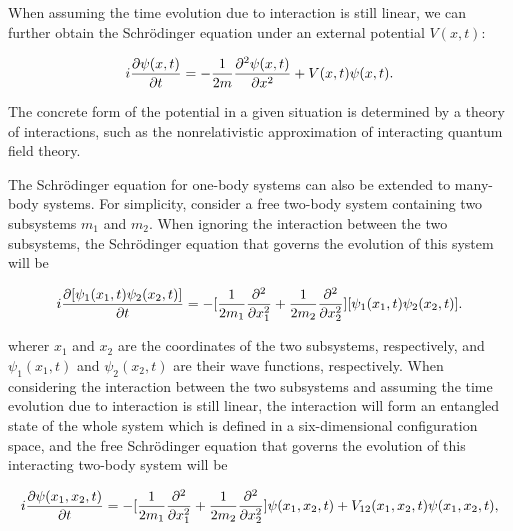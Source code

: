 When assuming the time evolution due to interaction is still linear, we can further obtain the Schr\"{o}dinger equation under an external potential $V(x,t)$:

\begin{equation}
i{\partial \psi(x,t) \over \partial t}=-{1 \over 2m}{{\partial^2 \psi(x,t)}\over \partial x^2}+V(x,t)\psi(x,t).
\label{Sch}
\end{equation}

\noindent The concrete form of the potential in a given situation is determined by a theory of interactions, such as the nonrelativistic approximation of interacting quantum field theory. 

The Schr\"{o}dinger equation for one-body systems can also be extended to many-body systems. For simplicity, consider a free two-body system containing two subsystems $m_1$ and $m_2$. When ignoring the interaction between the two subsystems, the Schr\"{o}dinger equation that governs the evolution of this system will be

\begin{equation}
i{\partial [\psi_1(x_1,t)\psi_2(x_2,t)] \over \partial t}=-[{1 \over 2m_1}{{\partial^2 }\over \partial x_1^2}+{1 \over 2m_2}{{\partial^2 }\over \partial x_2^2}][\psi_1(x_1,t)\psi_2(x_2,t)]. 
\label{FSch2}
\end{equation}

\noindent wherer $x_1$ and $x_2$ are the coordinates of the two subsystems, respectively, and $\psi_1(x_1,t)$ and $\psi_2(x_2,t)$ are their wave functions, respectively. When considering the interaction between the two subsystems and assuming the time evolution due to interaction is still linear, the interaction will form an entangled state of the whole system which is defined in a six-dimensional configuration space, and the free Schr\"{o}dinger equation that governs the evolution of this  interacting two-body system will be

\begin{equation}
i{\partial \psi(x_1,x_2,t) \over \partial t}=-[{1 \over 2m_1}{{\partial^2 }\over \partial x_1^2}+{1 \over 2m_2}{{\partial^2 }\over \partial x_2^2}]\psi(x_1,x_2,t)+V_{12}(x_1,x_2,t)\psi(x_1,x_2,t),
\label{FSch2i}
\end{equation}

